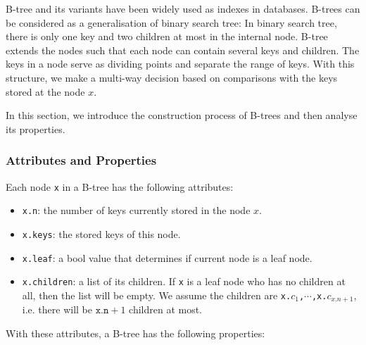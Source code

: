 
B-tree and its variants have been widely used as indexes in databases. B-trees can be considered as a generalisation of binary search tree: In binary search tree, there is only one key and two children at most in the internal node. B-tree extends the nodes such that each node can contain several keys and children. The keys in a node serve as dividing points and separate the range of keys. With this structure, we make a multi-way decision based on comparisons with the keys stored at the node $x$.

In this section, we introduce the construction process of B-trees and then analyse its properties.

\subsubsection{Attributes and Properties}

Each node \texttt{x} in a B-tree has the following attributes:

\begin{itemize}
\item \texttt{x.n}: the number of keys currently stored in the node $x$.
\item \texttt{x.keys}: the stored keys of this node.
\item \texttt{x.leaf}: a bool value that determines if current node is a leaf node.
\item \texttt{x.children}: a list of its children. If \texttt{x} is a leaf node who has no children at all, then the list will be empty. We assume the children are \texttt{x.$c_1$,$\cdots$,x.$c_{x.n+1}$}, i.e. there will be $\texttt{x.n}+1$ children at most.
\end{itemize}

\noindent
With these attributes, a B-tree has the following properties:

